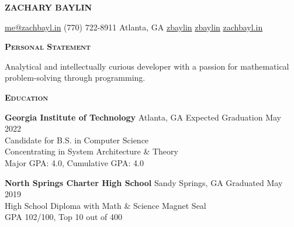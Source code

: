 \documentclass{article}
\newcommand{\sectionHeader}[1]{{\large \textbf{\textsc{#1}}}\hspace{5pt}\xrfill[.5ex]{.4pt}}
\newcommand{\headerInfoSpacer}{\hspace{10pt}}
\begin{document}
  \begin{center}
    \textbf{{\Huge Z}{\huge ACHARY} \hspace{1pt} {\Huge B}{\huge AYLIN}}

    \vspace{3pt}

    \href{mailto:me@zachbayl.in}{\faEnvelope \hspace{1pt} me@zachbayl.in} \headerInfoSpacer \faPhone \hspace{1pt} (770) 722-8911 \headerInfoSpacer {} Atlanta, GA \headerInfoSpacer \href{https://linkedin.com/in/zbaylin}{\faLinkedin \hspace{1pt} zbaylin} \headerInfoSpacer \href{https://github.com/zbaylin}{\faGithub \hspace{1pt} zbaylin} \headerInfoSpacer \href{https://zachbayl.in}{\faGlobeAmericas \hspace{1pt} zachbayl.in}\\
  \end{center}

  \sectionHeader{Personal Statement}

  \vspace{3pt}

  Analytical and intellectually curious developer with a passion for mathematical problem-solving through programming.

  \vspace{8pt}

  \sectionHeader{Education}

  \vspace{3pt}

  \textbf{Georgia Institute of Technology} \hspace{3pt} {\footnotesize {}} Atlanta, GA \hspace*{\fill} {\footnotesize {}} \hspace{1pt} Expected Graduation May 2022\\
  Candidate for B.S. in Computer Science\\
  Concentrating in System Architecture \& Theory\\
  Major GPA: 4.0, Cumulative GPA: 4.0

  \vspace{5pt}

  \textbf{North Springs Charter High School} \hspace{3pt} {\footnotesize {}} Sandy Springs, GA \hspace*{\fill} {\footnotesize {}} \hspace{1pt} Graduated May 2019\\
  High School Diploma with Math \& Science Magnet Seal\\
  GPA 102/100, Top 10 out of 400
\end{document}
